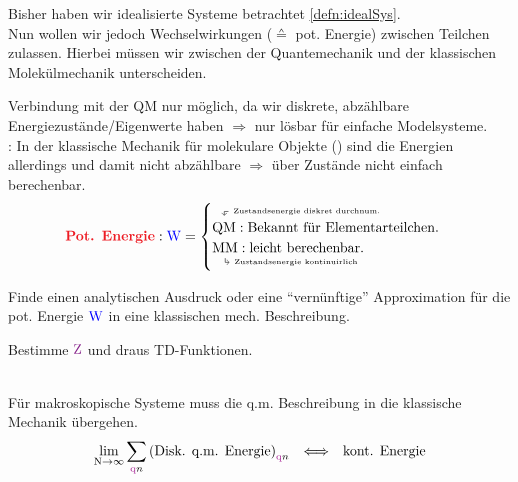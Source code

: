 \begin{sectionbox}[Ziel]\nospacing
  Bisher haben wir idealisierte Systeme betrachtet \cref{defn:idealSys}.\\
  Nun wollen wir jedoch Wechselwirkungen ($\corresponds$ pot. Energie) zwischen Teilchen zulassen.
  Hierbei müssen wir zwischen der Quantemechanik und der klassischen Molekülmechanik unterscheiden.
\end{sectionbox}
\begin{sectionbox}[Problem]\nospacing
   Verbindung mit der QM nur möglich, da
  wir diskrete, abzählbare Energiezustände/Eigenwerte haben $\Rightarrow$ nur lösbar für einfache Modelsysteme.\\
  : In der klassische Mechanik für molekulare Objekte () sind die Energien allerdings 
  und damit nicht abzählbare $\Rightarrow$  über Zustände nicht einfach berechenbar.
  \begin{align*}
    \rdb{\text{Pot. Energie}}: \Wpot=
      \begin{cases}
        \tura{\text{QM}}{\normalfont{Zustandsenergie diskret durchnum.}}: \text{Bekannt für Elementarteilchen.}\\
        \bdra{\text{MM}}{\normalfont{Zustandsenergie kontinuirlich}}: \text{leicht berechenbar.}\\
      \end{cases}
  \end{align*}
\end{sectionbox}
\begin{sectionbox}[Vorgehensweise]\nospacing
 \begin{circlelist}
     \item Finde einen analytischen Ausdruck oder eine ``vernünftige'' Approximation für die pot. Energie $\textcolor{blue}{\mathrm{W}}$ in eine klassischen
   mech. Beschreibung.
     \item Bestimme $\Zz$ und draus TD-Funktionen.
 \end{circlelist}
\end{sectionbox}
\begin{principbox}
  \begin{princip}[Korrespondenzprinzip]\nospacing \leavevmode\\
    Für makroskopische Systeme muss die q.m. Beschreibung in die klassische Mechanik übergehen.
    \begin{align*}
      \lim_{\Nz\to\infty}\sum_{\nqz}\left(\text{Disk. q.m. Energie}\right)_{\nqz}&&\Longleftrightarrow&&\text{kont. Energie} 
    \end{align*}
  \end{princip}
\end{principbox}
